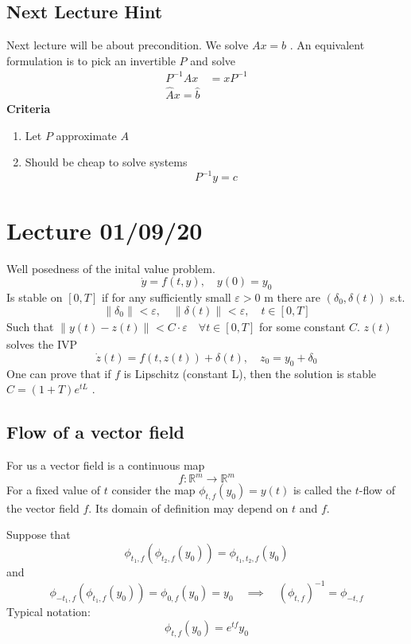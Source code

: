 \documentclass{article}
\theoremstyle{remark}
\begin{document}
 
\subsection{Next Lecture Hint}%
\label{sub:next_lecture_hint}

Next lecture will be about precondition. We solve $Ax =b$ . An equivalent formulation is to pick an invertible $P$ and solve \[
  \begin{split}
P^{-1} Ax &=   x P^{-1} \\
\hat{A} x = \hat{b}
  \end{split} 
\]  
\textbf{Criteria } 
\begin{enumerate}
  \item Let $P$ approximate $A$ 
  \item Should be cheap to solve systems \[
  P^{-1} y = c
  \] 
\end{enumerate}

\newpage
\section{Lecture 01/09/20}%
\label{sec:lecture_01_09_20}

Well posedness of the inital value problem. \[
\dot{y} = f\left( t,y \right), \quad y\left( 0 \right) = y_{0} 
\] 
Is stable on $\left[ 0,T \right] $ if for any sufficiently small $\varepsilon > 0$ m there are $\left( \delta _{0}, \delta \left( t \right) \right)$ s.t.\[
\|\delta _{0}\|_{}^{} < \varepsilon  , \quad  \|\delta \left( t \right)\|_{}^{} < \varepsilon  , \quad  t \in  \left[ 0,T \right] 
\] 
Such that $\|y\left( t \right) - z\left( t \right)\|_{}^{} < C\cdot \varepsilon \quad  \forall t \in \left[ 0,T \right]  $  for some constant $C$. $z\left( t \right)$ solves the IVP \[
\dot{z} \left( t \right) = f\left( t, z\left( t \right) \right) + \delta \left( t \right) , \quad  z_{0} = y_{0} + \delta _{0} 
\] 
One can prove that if $f$ is Lipschitz (constant L), then the solution is stable $C= (1+T) e^{tL}$ . 

\subsection{Flow of a vector field}%
\label{sub:flow_of_a_vector_field}

For us a vector field is a continuous map \[
f: \mathbb{R} ^{m} \to  \mathbb{R} ^{m}
\] 
For a fixed value of $t$ consider the map $\phi _{t,f}\left( y_{0} \right)  = y\left( t \right)$ is called the $t$-flow of the vector field $f$. Its domain of definition may depend on $t$ and $f$.
\begin{tcolorbox}
  Suppose that \[
    \phi _{t_{1}, f} \left( \phi _{t_{2} , f} \left( y_{0} \right) \right) = \phi _{t_{1}, t_{2}, f} \left( y_{0} \right)
  \] 
  and \[
  \phi _{-t_{1}, f} \left( \phi _{t_{1}, f}\left( y_{0} \right) \right) = \phi_{0, f} \left( y_{0} \right) = y_{0} \quad  \implies  \quad  \left( \phi _{t, f} \right)^{-1} = \phi _{-t, f}  
  \] 
  Typical notation: \[
   \phi _{t,f}\left( y_{0} \right) = e^{tf} y_{0}
  \]   
\end{tcolorbox}
\end{document}
